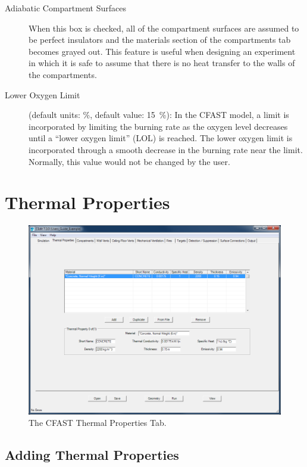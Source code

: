 \begin{description}
\item[Adiabatic Compartment Surfaces] When this box is checked, all of the compartment surfaces are assumed to be perfect insulators and the materials section of the compartments tab becomes grayed out. This feature is useful when designing an experiment in which it is safe to assume that there is no heat transfer to the walls of the compartments.

\item[Lower Oxygen Limit] (default units: \%, default value: 15~\%):  In the CFAST model, a limit is incorporated by limiting the burning rate as the oxygen level decreases until a ``lower oxygen limit'' (LOL) is reached. The lower oxygen limit is incorporated through a smooth decrease in the burning rate near the limit. Normally, this value would not be changed by the user.
\end{description}





\chapter{Thermal Properties}

\begin{figure}[ht]
\centering
\includegraphics[width=6.5in]{FIGURES/Thermal_Properties_Tab}
\caption[The CFAST Thermal Properties Tab]{The CFAST Thermal Properties Tab.}
\end{figure}

\section{Adding Thermal Properties}
\label{info:MATL}

